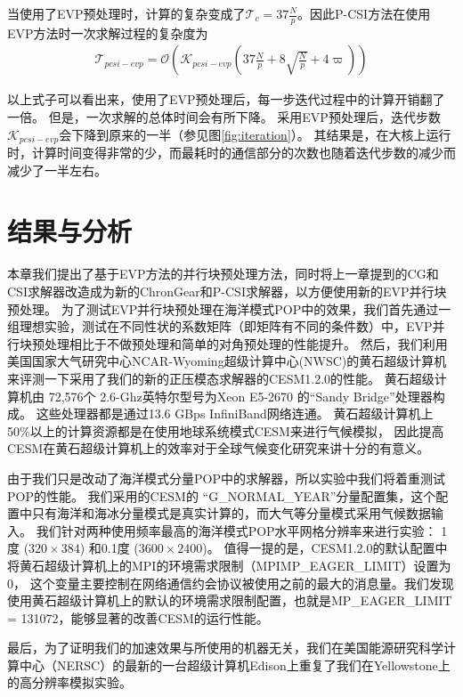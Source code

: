 当使用了EVP预处理时，计算的复杂变成了$\mathcal{T}_c = 37 \frac{N}{p}$。因此P-CSI方法在使用EVP方法时一次求解过程的复杂度为
\begin{eqnarray}
\label{t_pcsiEvp}
\mathcal{T}_{pcsi-evp}=\mathcal{O}(\mathcal{K}_{pcsi-evp} (37\frac{N}{p} +8\sqrt{\frac{N }{p}} + 4\varpi))
\end{eqnarray}

以上式子可以看出来，使用了EVP预处理后，每一步迭代过程中的计算开销翻了一倍。
但是，一次求解的总体时间会有所下降。 
采用EVP预处理后，迭代步数$\mathcal{K}_{pcsi-evp}$会下降到原来的一半（参见图\ref{fig:iteration}）。
其结果是，在大核上运行时，计算时间变得非常的少，而最耗时的通信部分的次数也随着迭代步数的减少而减少了一半左右。



\section{结果与分析}
\label{precond:exp}


本章我们提出了基于EVP方法的并行块预处理方法，同时将上一章提到的CG和CSI求解器改造成为新的ChronGear和P-CSI求解器，以方便使用新的EVP并行块预处理。
为了测试EVP并行块预处理在海洋模式POP中的效果，我们首先通过一组理想实验，测试在不同性状的系数矩阵（即矩阵有不同的条件数）中，EVP并行块预处理相比于不做预处理和简单的对角预处理的性能提升。
然后，我们利用美国国家大气研究中心NCAR-Wyoming超级计算中心(NWSC)\cite{loft:2015}的黄石超级计算机来评测一下采用了我们的新的正压模态求解器的CESM1.2.0的性能。 
黄石超级计算机由 72,576个
2.6-Ghz英特尔型号为Xeon E5-2670 的“Sandy Bridge”处理器构成。 
这些处理器都是通过13.6 GBps InfiniBand网络连通。   
黄石超级计算机上50\%以上的计算资源都是在使用地球系统模式CESM来进行气候模拟， 
因此提高CESM在黄石超级计算机上的效率对于全球气候变化研究来讲十分的有意义\cite{wf2014}。 


由于我们只是改动了海洋模式分量POP中的求解器，所以实验中我们将着重测试POP的性能。 
我们采用的CESM的
“G\_NORMAL\_YEAR”分量配置集，这个配置中只有海洋和海冰分量模式是真实计算的，而大气等分量模式采用气候数据输入。
我们针对两种使用频率最高的海洋模式POP水平网格分辨率来进行实验：
1度 ($320\times 384$) 和0.1度 ($3600\times 2400$)。
值得一提的是，CESM1.2.0的默认配置中将黄石超级计算机上的MPI的环境需求限制（MPIMP\_EAGER\_LIMIT）设置为0， 这个变量主要控制在网络通信约会协议被使用之前的最大的消息量。我们发现使用黄石超级计算机上的默认的环境需求限制配置，也就是MP\_EAGER\_LIMIT = 131072，能够显著的改善CESM的运行性能。 

最后，为了证明我们的加速效果与所使用的机器无关，我们在美国能源研究科学计算中心（NERSC）的最新的一台超级计算机Edison上重复了我们在Yellowstone上的高分辨率模拟实验。



